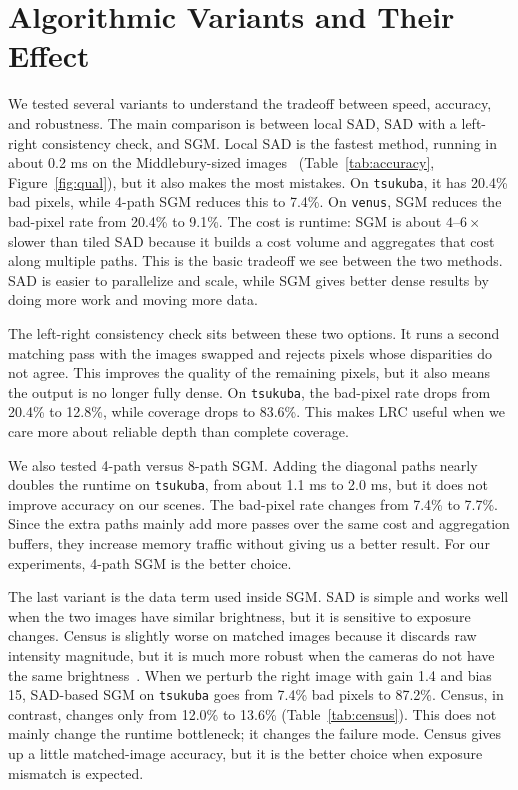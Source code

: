\documentclass[11pt]{article}
\begin{document}
\section{Algorithmic Variants and Their Effect}
\label{sec:variants}

We tested several variants to understand the tradeoff between speed, accuracy,
and robustness. The main comparison is between local SAD, SAD with a left-right
consistency check, and SGM. Local SAD is the fastest method, running in about
0.2 ms on the Middlebury-sized images~\cite{scharstein2002}
(Table~\ref{tab:accuracy}, Figure~\ref{fig:qual}), but it also makes the most
mistakes. On \texttt{tsukuba}, it has 20.4\% bad pixels, while 4-path SGM
reduces this to 7.4\%. On \texttt{venus}, SGM reduces the bad-pixel rate from
20.4\% to 9.1\%. The cost is runtime: SGM is about $4$--$6\times$ slower than
tiled SAD because it builds a cost volume and aggregates that cost along multiple
paths. This is the basic tradeoff we see between the two methods. SAD is easier
to parallelize and scale, while SGM gives better dense results by doing more
work and moving more data.

The left-right consistency check sits between these two options. It runs a
second matching pass with the images swapped and rejects pixels whose disparities
do not agree. This improves the quality of the remaining pixels, but it also
means the output is no longer fully dense. On \texttt{tsukuba}, the bad-pixel
rate drops from 20.4\% to 12.8\%, while coverage drops to 83.6\%. This makes LRC
useful when we care more about reliable depth than complete coverage.

We also tested 4-path versus 8-path SGM. Adding the diagonal paths nearly doubles
the runtime on \texttt{tsukuba}, from about 1.1 ms to 2.0 ms, but it does not
improve accuracy on our scenes. The bad-pixel rate changes from 7.4\% to 7.7\%.
Since the extra paths mainly add more passes over the same cost and aggregation
buffers, they increase memory traffic without giving us a better result. For our
experiments, 4-path SGM is the better choice.

The last variant is the data term used inside SGM. SAD is simple and works well
when the two images have similar brightness, but it is sensitive to exposure
changes. Census is slightly worse on matched images because it discards raw
intensity magnitude, but it is much more robust when the cameras do not have the
same brightness~\cite{zabih1994}. When we perturb the right image with gain 1.4
and bias 15, SAD-based SGM on \texttt{tsukuba} goes from 7.4\% bad pixels to
87.2\%. Census, in contrast, changes only from 12.0\% to 13.6\%
(Table~\ref{tab:census}). This does not mainly change the runtime bottleneck; it
changes the failure mode. Census gives up a little matched-image accuracy, but
it is the better choice when exposure mismatch is expected.
\end{document}
